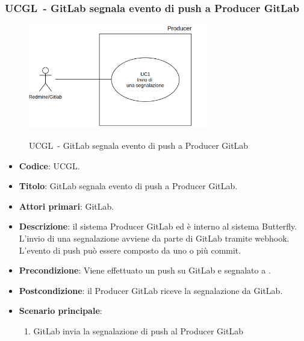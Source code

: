 	\subsubsection{UCGL\theuccount\ - GitLab segnala evento di push a Producer GitLab}
	\begin{figure}[H]
		\centering
		\includegraphics[width=0.7\textwidth]{img/UC1.png}\\
		\caption{UCGL\theuccount\ - GitLab segnala evento di push a Producer GitLab}
	\end{figure}
	\begin{itemize}
		\item \textbf{Codice}: UCGL\theuccount.
		\item \textbf{Titolo}: GitLab segnala evento di push a Producer GitLab.
		\item \textbf{Attori primari}: GitLab.
		\item \textbf{Descrizione}:
		il sistema Producer GitLab ed è interno al sistema Butterfly. L'invio di
		una segnalazione avviene da parte di GitLab tramite webhook. L'evento di
		push può essere composto da uno o più commit.
		\item \textbf{Precondizione}: Viene effettuato un push su GitLab e segnalato a \progetto.
		\item \textbf{Postcondizione}: il Producer GitLab riceve la segnalazione da GitLab.
		\item \textbf{Scenario principale}: 
		\begin{enumerate}
			\item GitLab invia la segnalazione di push al Producer GitLab
		\end{enumerate}
		
	\end{itemize}